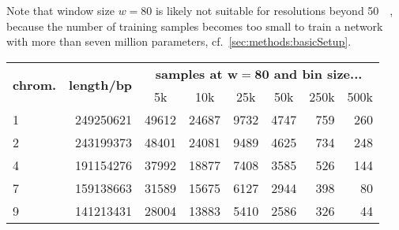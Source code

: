 Note that window size $w=80$ is likely not suitable for resolutions beyond \SI{50}{\kilo\bp}, because the number of training samples becomes too small
to train a network with more than seven million parameters, cf.~\cref{sec:methods:basicSetup}.
\begin{table}[hbp]
\centering
\begin{tabular}{lrrrrrrr}
\hline
\multicolumn{1}{c}{\multirow{2}{*}{\textbf{chrom.}}} & \multicolumn{1}{c}{\multirow{2}{*}{\textbf{length/bp}}} & \multicolumn{6}{c}{\textbf{samples at $\mathbf{w=80}$ and bin size...}}                                                                                                \\
\multicolumn{1}{c}{}                                     & \multicolumn{1}{c}{}                                    & \multicolumn{1}{c}{5k} & \multicolumn{1}{c}{10k} & \multicolumn{1}{c}{25k} & \multicolumn{1}{c}{50k} & \multicolumn{1}{c}{250k} & \multicolumn{1}{c}{500k} \\ \hline
1                                                        & 249250621                                               & 49612                  & 24687                   & 9732                    & 4747                    & 759                      & 260                      \\
2                                                        & 243199373                                               & 48401                  & 24081                   & 9489                    & 4625                    & 734                      & 248                      \\
4                                                        & 191154276                                               & 37992                  & 18877                   & 7408                    & 3585                    & 526                      & 144                      \\
7                                                        & 159138663                                               & 31589                  & 15675                   & 6127                    & 2944                    & 398                      & 80                       \\
9                                                        & 141213431                                               & 28004                  & 13883                   & 5410                    & 2586                    & 326                      & 44                       \\

\end{tabular}
\end{table}
